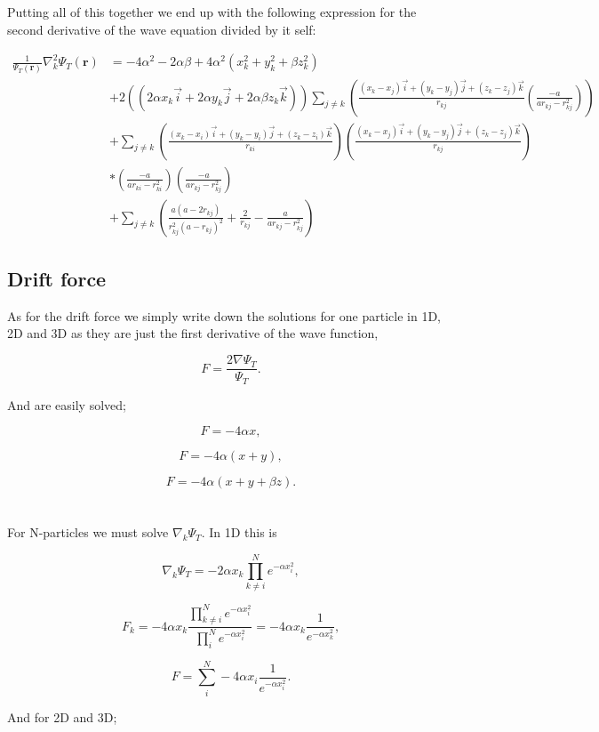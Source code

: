 Putting all of this together we end up with the following expression for the second derivative of the wave equation divided by it self:

\begin{align*}
\frac{1}{\Psi_T(\mathbf{r})}\nabla_k^2 \Psi_T(\mathbf{r}) &= -4\alpha^2 - 2\alpha \beta + 4\alpha^2(x_k^2 + y_k^2 + \beta z_k^2) \\
&+ 2((2\alpha x_k \vec{i} + 2\alpha y_k \vec{j} + 2\alpha \beta z_k \vec{k})) \sum_{j \ne k} \left( \frac{(x_k - x_j)\vec{i} + (y_k - y_j)\vec{j} + (z_k - z_j)\vec{k}}{r_{kj}} \left( \frac{-a}{ar_{kj} - r_{kj}^2} \right) \right)\\
&+ \sum_{j \ne k} \left( \frac{(x_k - x_i)\vec{i} + (y_k - y_i)\vec{j} + (z_k - z_i)\vec{k}}{r_{ki}} \right) \left( \frac{(x_k - x_j)\vec{i} + (y_k - y_j)\vec{j} + (z_k - z_j)\vec{k}}{r_{kj}} \right) \\
&* \left( \frac{-a}{ar_{ki} - r_{ki}^2} \right) \left( \frac{-a}{ar_{kj} - r_{kj}^2} \right)\\
&+ \sum_{j \ne k} \left( \frac{a(a - 2r_{kj})}{r_{kj}^2(a - r_{kj})^2} + \frac{2}{r_{kj}} - \frac{a}{ar_{kj} - r_{kj}^2}\right)
\end{align*}


\subsection{Drift force}
As for the drift force we simply write down the solutions for one particle in 1D, 2D and 3D as they are just the first derivative of the wave function,

$$F = \frac{2 \nabla \Psi_T}{\Psi_T}.$$

And are easily solved;

$$F = -4 \alpha x,$$

$$F = -4 \alpha (x + y),$$

$$F = -4 \alpha (x + y + \beta z).$$
\\
\\
For N-particles we must solve $\nabla_k \Psi_T$. In 1D this is

$$\nabla_k \Psi_T = -2 \alpha x_k \prod_{k \ne i}^N e^{-\alpha x_i^2},$$

$$F_k = -4\alpha x_k \frac{\prod_{k \ne i}^N e^{-\alpha x_i^2}}{\prod_{i}^N e^{-\alpha x_i^2}} = -4\alpha x_k \frac{1}{e^{-\alpha x_k^2}},$$

$$F = \sum_i^N -4\alpha x_i \frac{1}{e^{-\alpha x_i^2}}.$$

And for 2D and 3D; 


